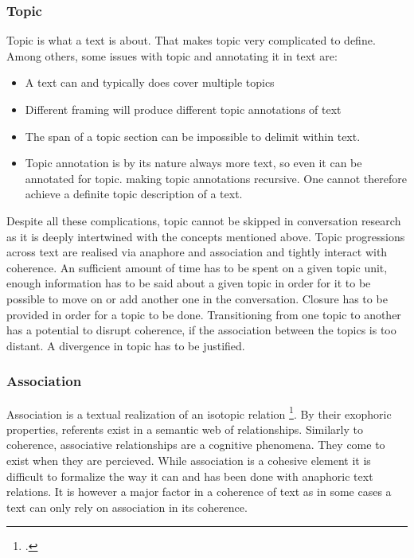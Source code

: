 \documentclass[12pt]{report}
\begin{document}
{\subsubsection{Topic}
\par
    Topic is what a text is about.
    That makes topic very complicated to define.
    Among others, some issues with topic and annotating it in text are:

\begin{itemize}
\item
A text can and typically does cover multiple topics
\item
Different framing will produce different topic annotations of text
\item
The span of a topic section can be impossible to delimit within text.
\item
Topic annotation is by its nature always more text,
            so even it can be annotated for topic.
            making topic annotations recursive.
            One cannot therefore achieve a definite topic description of a text.
\end{itemize}

\par
    Despite all these complications,
    topic cannot be skipped in conversation research
    as it is deeply intertwined with the concepts mentioned above.
    Topic progressions across text are realised via anaphore and association
    and tightly interact with coherence.
    An sufficient amount of time has to be spent on a given topic unit,
    enough information has to be said about a given topic
    in order for it to be possible to move on or add another one in the conversation.
    Closure has to be provided in order for a topic to be done.
    Transitioning from one topic to another has a potential to disrupt coherence,
    if the association between the topics is too distant.
    A divergence in topic has to be justified.

\subsubsection{Association}
\par
    Association is a textual realization of an isotopic relation \footcite{koblizek2015}.
    By their exophoric properties, referents exist in a semantic web of relationships.
    Similarly to coherence, associative relationships are a cognitive phenomena.
    They come to exist when they are percieved.
    While association is a cohesive element it is difficult to formalize
    the way it can and has been done with anaphoric text relations.
    It is however a major factor in a coherence of text as
    in some cases a text can only rely on association in its coherence.

}
\end{document}
